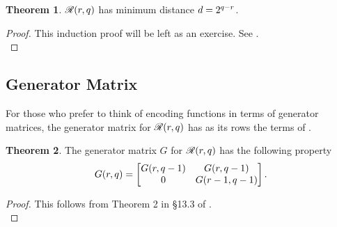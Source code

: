 \documentclass[12pt,twoside]{reedthesis}
\theoremstyle{definition}
\newtheorem{theorem}{Theorem}[chapter]
\begin{document}
\begin{theorem} 
$\mathscr{R}(r,q)$ has minimum distance $d = 2^{q-r}$.
\end{theorem}
\begin{proof}
This induction proof will be left as an exercise. See \citep{macwilliamssloane}.\\
\end{proof}
\subsection{Generator Matrix}
For those who prefer to think of encoding functions in terms of generator matrices, the generator matrix for $\mathscr{R}(r,q)$ has as its rows the terms of \rmexp.

\begin{theorem} The generator matrix $G$ for $\mathscr{R}(r, q)$ has the following property
\begin{equation*}
G(r, q) = 
\begin{bmatrix}
G(r, q-1) & G(r, q-1) \\
0 & G(r-1,q-1)
\end{bmatrix} .
\end{equation*}
\end{theorem}

\begin{proof}
This follows from Theorem 2 in \S 13.3 of \citep{macwilliamssloane}.\\
\end{proof}
\end{document}
